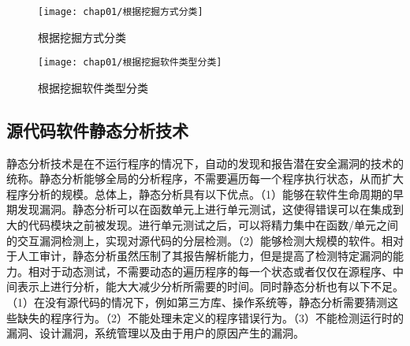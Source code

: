 \begin{figure}[htb]
\begin{center}
\texttt{[image: chap01/根据挖掘方式分类]}
\end{center}
\caption{根据挖掘方式分类}
\label{根据挖掘方式分类}
\end{figure}


\begin{figure}[htb]
\begin{center}
\texttt{[image: chap01/根据挖掘软件类型分类]}
\end{center}
\caption{根据挖掘软件类型分类}
\label{根据挖掘软件类型分类}
\end{figure}
\subsection{源代码软件静态分析技术}

静态分析技术是在不运行程序的情况下，自动的发现和报告潜在安全漏洞的技术的统称。静态分析能够全局的分析程序，不需要遍历每一个程序执行状态，从而扩大程序分析的规模。总体上，静态分析具有以下优点。（1）能够在软件生命周期的早期发现漏洞。静态分析可以在函数单元上进行单元测试，这使得错误可以在集成到大的代码模块之前被发现。进行单元测试之后，可以将精力集中在函数/单元之间的交互漏洞检测上，实现对源代码的分层检测。（2）能够检测大规模的软件。相对于人工审计，静态分析虽然压制了其报告解析能力，但是提高了检测特定漏洞的能力。相对于动态测试，不需要动态的遍历程序的每一个状态或者仅仅在源程序、中间表示上进行分析，能大大减少分析所需要的时间。同时静态分析也有以下不足。（1）在没有源代码的情况下，例如第三方库、操作系统等，静态分析需要猜测这些缺失的程序行为。（2）不能处理未定义的程序错误行为。（3）不能检测运行时的漏洞、设计漏洞，系统管理以及由于用户的原因产生的漏洞。

%
%

